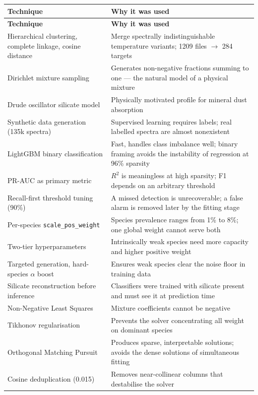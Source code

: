 \documentclass[11pt,a4paper]{article}
\newcommand{\code}[1]{\texttt{\small #1}}
\begin{document}
\small
\begin{longtable}{@{}L{5.0cm}L{10.0cm}@{}}
\toprule
\textbf{Technique} & \textbf{Why it was used} \\
\midrule
\endfirsthead
\toprule
\textbf{Technique} & \textbf{Why it was used} \\
\midrule
\endhead
Hierarchical clustering, complete linkage, cosine distance &
Merge spectrally indistinguishable temperature variants; 1209 files
$\rightarrow$ 284 targets \\
Dirichlet mixture sampling &
Generates non-negative fractions summing to one --- the natural model of a
physical mixture \\
Drude oscillator silicate model &
Physically motivated profile for mineral dust absorption \\
Synthetic data generation (135k spectra) &
Supervised learning requires labels; real labelled spectra are almost
nonexistent \\
LightGBM binary classification &
Fast, handles class imbalance well; binary framing avoids the instability
of regression at 96\% sparsity \\
PR-AUC as primary metric &
$R^2$ is meaningless at high sparsity; F1 depends on an arbitrary threshold \\
Recall-first threshold tuning (90\%) &
A missed detection is unrecoverable; a false alarm is removed later by the
fitting stage \\
Per-species \code{scale\_pos\_weight} &
Species prevalence ranges from 1\% to 8\%; one global weight cannot serve
both \\
Two-tier hyperparameters &
Intrinsically weak species need more capacity and higher positive weight \\
Targeted generation, hard-species $\alpha$ boost &
Ensures weak species clear the noise floor in training data \\
Silicate reconstruction before inference &
Classifiers were trained with silicate present and must see it at
prediction time \\
Non-Negative Least Squares &
Mixture coefficients cannot be negative \\
Tikhonov regularisation &
Prevents the solver concentrating all weight on dominant species \\
Orthogonal Matching Pursuit &
Produces sparse, interpretable solutions; avoids the dense solutions of
simultaneous fitting \\
Cosine deduplication (0.015) &
Removes near-collinear columns that destabilise the solver \\

\end{longtable}
\end{document}
